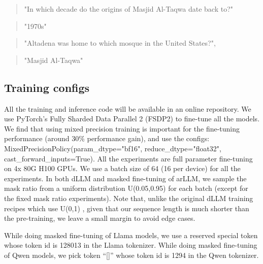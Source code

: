 \begin{description}
\begin{quote}
"In which decade do the origins of Masjid Al-Taqwa date back to?"

\end{quote}

  \item[Answer:]
  \begin{quote}

"1970s"

\end{quote}

  \item[Backward question:]
  \begin{quote}

"Altadena was home to which mosque in the United States?",

\end{quote}

  \item[Answer:]
  \begin{quote}

"Masjid Al-Taqwa"

\end{quote}
\end{description}

\subsection{Training configs}
\label{app:fine-tuning}

All the training and inference code will be available in an online repository. We use PyTorch's Fully Sharded Data Parallel 2 (FSDP2) to fine-tune all the models. We find that using mixed precision training is important for the fine-tuning performance (around 30\% performance gain), and use the configs: MixedPrecisionPolicy(param\_dtype="bf16", reduce\_dtype="float32", cast\_forward\_inputs=True). All the experiments are full parameter fine-tuning on 4x 80G H100 GPUs. We use a batch size of 64 (16 per device) for all the experiments. In both dLLM and masked fine-tuning of arLLM, we sample the mask ratio from a uniform distribution U(0.05,0.95) for each batch (except for the fixed mask ratio experiments). Note that, unlike the original dLLM training recipes which use U(0,1) \citep{llada}, given that our sequence length is much shorter than the pre-training, we leave a small margin to avoid edge cases.

While doing masked fine-tuning of Llama models, we use a reserved special token whose token id is 128013 in the Llama tokenizer. While doing masked fine-tuning of Qwen models, we pick token ``[]'' whose token id is 1294 in the Qwen tokenizer.

